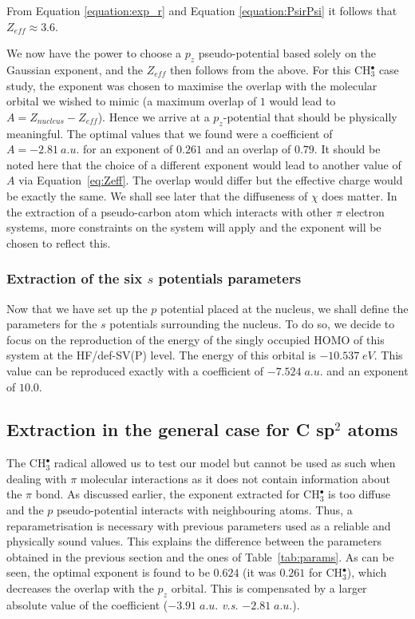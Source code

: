 \documentclass[aip]{revtex4-1}
\begin{document}
From Equation \ref{equation:exp_r} and Equation \ref{equation:PsirPsi} it follows that \(Z_{eff} \approx 3.6\). 

We now have the power to choose a \(p_{z}\) pseudo-potential based solely on the Gaussian
exponent, and the \(Z_{eff}\) then follows from the above.
For this CH\(^{\bullet}_{3}\) case study, 
the exponent was chosen to maximise the overlap with the molecular
orbital we wished to mimic (a maximum overlap of $1$ would lead to
$A=Z_{nucleus}-Z_{eff}$).
Hence we arrive at a \(p_{z}\)-potential that should be physically meaningful. 
The optimal values that we found
were a coefficient of $A=-2.81 \ a.u.$ for 
an exponent of $0.261$ and an overlap of $0.79$. 
It should be noted here that the choice of a different exponent would lead to another value
of $A$ via Equation~\ref{eq:Zeff}.
The overlap would differ but the effective charge would be exactly the same.
We shall see later that the diffuseness of $\chi$ does matter. In the extraction of a pseudo-carbon atom which interacts with other
$\pi$ electron systems, more constraints on the system will apply and the exponent
will be chosen to reflect this.

\subsubsection{Extraction of the six $s$ potentials parameters}
Now that we have set up the $p$ potential placed at the nucleus, we shall define
the parameters for the $s$ potentials surrounding the nucleus.
To do so, we decide to focus on the reproduction of the energy of the singly
occupied HOMO of this system
at the HF/def-SV(P) level. The energy of this orbital is $-10.537\;eV$.
This value can be reproduced exactly with a coefficient of $-7.524\;a.u.$
and an exponent of $10.0$.

\subsection{Extraction in the general case for C sp$^2$ atoms}
\label{section:csp2_extraction}
The CH$_3^\bullet$ radical allowed us to test our model but cannot be used
as such when dealing with $\pi$ molecular interactions as it does not contain
information about the $\pi$ bond.
As discussed earlier, the exponent extracted for CH$_3^\bullet$ is too diffuse
and the $p$ pseudo-potential interacts with neighbouring atoms.
Thus, a reparametrisation is necessary with previous parameters used as a reliable
and physically sound values.
This explains the difference between the parameters obtained in the previous
section and the ones of Table~\ref{tab:params}.
As can be seen, the optimal exponent is found to be $0.624$ (it was $0.261$ for
CH$_3^\bullet$), which decreases the overlap with the $p_z$ orbital.
This is compensated by a larger absolute value of the coefficient ($-3.91\;a.u.$ \textsl{v.s.} $-2.81\;a.u.$).
\end{document}
